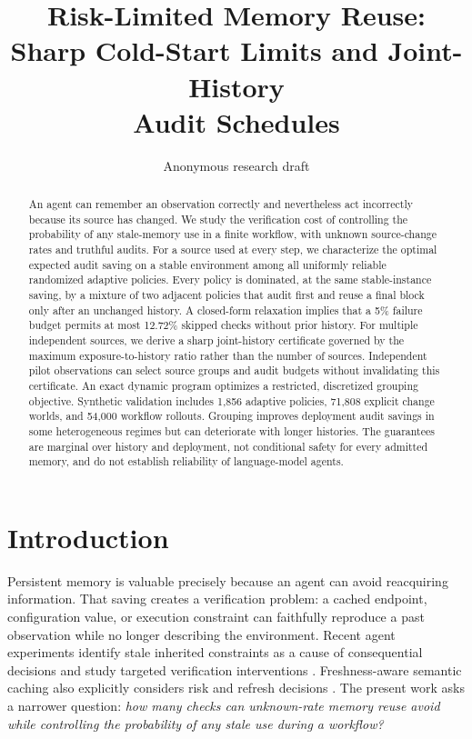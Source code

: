 \documentclass{article}
\title{Risk-Limited Memory Reuse:\\Sharp Cold-Start Limits and Joint-History\\Audit Schedules}
\author{Anonymous research draft}
\date{}
\newcommand{\1}{\mathbf 1}
\begin{document}
\maketitle
{}
\begin{abstract}
An agent can remember an observation correctly and nevertheless act incorrectly because its source has changed. We study the verification cost of controlling the probability of any stale-memory use in a finite workflow, with unknown source-change rates and truthful audits. For a source used at every step, we characterize the optimal expected audit saving on a stable environment among all uniformly reliable randomized adaptive policies. Every policy is dominated, at the same stable-instance saving, by a mixture of two adjacent policies that audit first and reuse a final block only after an unchanged history. A closed-form relaxation implies that a 5\% failure budget permits at most 12.72\% skipped checks without prior history. For multiple independent sources, we derive a sharp joint-history certificate governed by the maximum exposure-to-history ratio rather than the number of sources. Independent pilot observations can select source groups and audit budgets without invalidating this certificate. An exact dynamic program optimizes a restricted, discretized grouping objective. Synthetic validation includes 1,856 adaptive policies, 71,808 explicit change worlds, and 54,000 workflow rollouts. Grouping improves deployment audit savings in some heterogeneous regimes but can deteriorate with longer histories. The guarantees are marginal over history and deployment, not conditional safety for every admitted memory, and do not establish reliability of language-model agents.
\end{abstract}

\section{Introduction}
Persistent memory is valuable precisely because an agent can avoid reacquiring information. That saving creates a verification problem: a cached endpoint, configuration value, or execution constraint can faithfully reproduce a past observation while no longer describing the environment. Recent agent experiments identify stale inherited constraints as a cause of consequential decisions and study targeted verification interventions \citep{nakayashiki2026}. Freshness-aware semantic caching also explicitly considers risk and refresh decisions \citep{mansoor2026}. The present work asks a narrower question: \emph{how many checks can unknown-rate memory reuse avoid while controlling the probability of any stale use during a workflow?}
\end{document}
